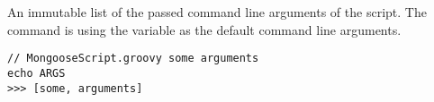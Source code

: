 %

An immutable list of the passed command line arguments of the script.
The command  is using the variable as the default command
line arguments.

\begin{lstlisting}[style=Groovybash, label={lst:example_args}, title={
Print the current command line arguments. The first line describes how the
script was called.}]
// MongooseScript.groovy some arguments
echo ARGS
>>> [some, arguments]
\end{lstlisting}

